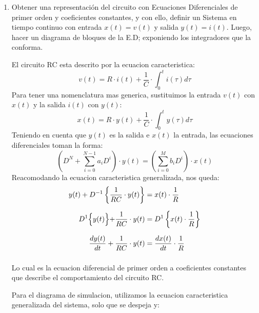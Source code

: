 \documentclass[12pt,a4paper]{report}
\begin{document}
  \begin{enumerate}[label=\alph*)]
    \item Obtener una representación del circuito con Ecuaciones Diferenciales de primer orden y coeficientes
      constantes, y con ello, definir un Sistema en tiempo continuo con entrada $x(t) = v(t)$ y salida $y(t) = i(t)$.
      Luego, hacer un diagrama de bloques de la E.D; exponiendo los integradores que la conforma.

      El circuito RC esta descrito por la ecuacion caracteristica:
      $$v(t) = R\cdot i(t) + \frac{1}{C} \cdot \int_{0}^{t} i(\tau) d\tau$$
      Para tener una nomenclatura mas generica, sustituimos la entrada $v(t)$ con $x(t)$ y la salida $i(t)$ con $y(t)$:
      $$x(t) = R\cdot y(t) + \frac{1}{C} \cdot \int_{0}^{t} y(\tau) d\tau$$
      Teniendo en cuenta que $y(t)$ es la salida e $x(t)$ la entrada, las ecuaciones diferenciales toman la forma:
      $$\left(D^N + \sum_{i=0}^{N-1} a_i D^i\right) \cdot y(t) = \left(\sum_{i=0}^{M} b_i D^i\right) \cdot x(t)$$
      Reacomodando la ecuacion caracteristica generalizada, nos queda:
      $$
      \begin{aligned}
        y(t) + D^{-1} \left\{\frac{1}{RC} \cdot y(t) \right\} &= x(t) \cdot \frac{1}{R}\\[6pt]
        D^1\Bigl\{y(t) \Bigl\} + \frac{1}{RC} \cdot y(t) &= D^1\left\{x(t) \cdot \frac{1}{R} \right\}\\[6pt]
        \frac{dy(t)}{dt} + \frac{1}{RC} \cdot y(t) &= \frac{dx(t)}{dt} \cdot \frac{1}{R}\\[6pt]
      \end{aligned}
      $$

      Lo cual es la ecuacion diferencial de primer orden a coeficientes constantes que describe el comportamiento del
      circuito RC.

      Para el diagrama de simulacion, utilizamos la ecuacion caracteristica generalizada del sistema, solo que se
      despeja y:
      \begin{figure}[h]
        \centering
\end{figure}
\end{enumerate}
\end{document}

